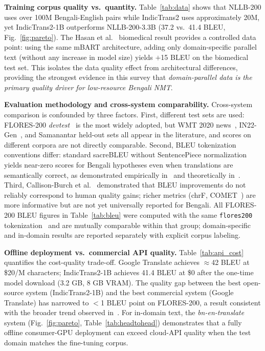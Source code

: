 \documentclass[conference]{IEEEtran}
\begin{document}
\textbf{Training corpus quality vs.\ quantity.}
Table~\ref{tab:data} shows that NLLB-200 uses over 100M Bengali-English pairs
while IndicTrans2 uses approximately 20M, yet IndicTrans2-1B outperforms
NLLB-200-3.3B (37.2 vs.\ 41.4 BLEU, Fig.~\ref{fig:pareto}).
The Hasan et al.~\cite{hasan2020low} biomedical result provides a controlled
data point: using the same mBART architecture, adding only domain-specific
parallel text (without any increase in model size) yields $+$15 BLEU on the
biomedical test set.
This isolates the data quality effect from architectural differences, providing
the strongest evidence in this survey that \textit{domain-parallel data is the
primary quality driver for low-resource Bengali NMT}.

\textbf{Evaluation methodology and cross-system comparability.}
Cross-system comparison is confounded by three factors.
First, different test sets are used: FLORES-200 \textit{devtest}~\cite{nllb2022}
is the most widely adopted, but WMT 2020 news~\cite{barrault2020wmt},
IN22-Gen~\cite{gala2023indictrans2}, and Samanantar held-out sets all appear
in the literature, and scores on different corpora are not directly comparable.
Second, BLEU tokenization conventions differ: standard sacreBLEU without
SentencePiece normalization yields near-zero scores for Bengali hypotheses even
when translations are semantically correct, as demonstrated empirically
in~\cite{biswas2025bnentr} and theoretically in~\cite{post2018sacrebleu}.
Third, Callison-Burch et al.~\cite{callison2006re} demonstrated that BLEU
improvements do not reliably correspond to human quality gains; richer metrics
(chrF, COMET~\cite{rei2020comet}) are more informative but are not yet
universally reported for Bengali.
All FLORES-200 BLEU figures in Table~\ref{tab:bleu} were computed with the
same \texttt{flores200} tokenization~\cite{nllb2022} and are mutually comparable
within that group; domain-specific and in-domain results are reported separately
with explicit corpus labeling.

\textbf{Offline deployment vs.\ commercial API quality.}
Table~\ref{tab:api_cost} quantifies the cost-quality trade-off.
Google Translate achieves $\approx$42 BLEU at \$20/M characters; IndicTrans2-1B
achieves 41.4 BLEU at \$0 after the one-time model download (3.2 GB, 8 GB VRAM).
The quality gap between the best open-source system (IndicTrans2-1B) and the
best commercial system (Google Translate) has narrowed to $<$1 BLEU point on
FLORES-200, a result consistent with the broader trend observed
in~\cite{nllb2022}.
For in-domain text, the \textit{bn-en-translate} system (Fig.~\ref{fig:pareto},
Table~\ref{tab:headtohead}) demonstrates that a fully offline consumer-GPU
deployment can exceed cloud-API quality when the test domain matches the
fine-tuning corpus.
\end{document}
